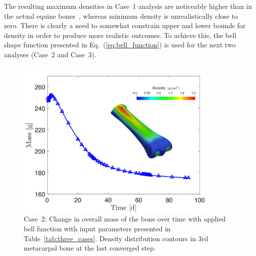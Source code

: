 \documentclass[11pt]{acmeArticle}
\numberwithin{equation}{section}
\begin{document}
The resulting maximum densities in Case~1 analysis are noticeably higher than in the actual equine bones~\citep{yamada2015experimental}, whereas minimum density is unrealistically close to zero. 
There is clearly a need to somewhat constrain upper and lower bounds for density in order to produce more realistic outcomes.
To achieve this, the bell shape function presented in Eq.~(\ref{eq:bell_function}) is used for the next two analyses (Case~2 and Case~3). 

\begin{figure}[h!]
	\begin{centering}
		\includegraphics[width=10cm]{Figures/graphs/density_bell1.png}
		\caption{Case~2: Change in overall mass of the bone over time with applied bell function with input parameters presented in Table~\ref{tab:three_cases}. Density distribution contours in 3rd metacarpal bone at the last converged step.}
		\label{fig:density_bell1}
	\end{centering}
\end{figure}
\end{document}
